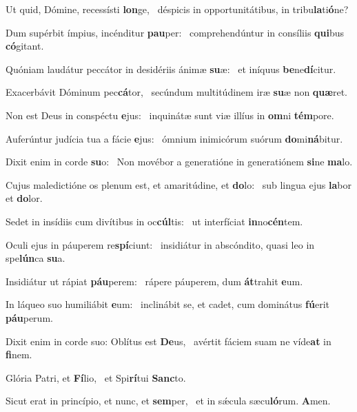 \item Ut quid, Dómine, recessísti \textbf{lon}ge,~\psstar{} déspicis in opportunitátibus, in tribu\textbf{la}ti\textbf{ó}ne?
\item Dum supérbit ímpius, incénditur \textbf{pau}per:~\psstar{} comprehendúntur in consíliis \textbf{qui}bus \textbf{có}gitant.
\item Quóniam laudátur peccátor in desidériis ánimæ \textbf{su}æ:~\psstar{} et iníquus \textbf{be}ne\textbf{dí}citur.
\item Exacerbávit Dóminum pec\textbf{cá}tor,~\psstar{} secúndum multitúdinem iræ \textbf{su}æ non \textbf{quæ}ret.
\item Non est Deus in conspéctu \textbf{e}jus:~\psstar{} inquinátæ sunt viæ illíus in \textbf{om}ni \textbf{tém}pore.
\item Auferúntur judícia tua a fácie \textbf{e}jus:~\psstar{} ómnium inimicórum suórum \textbf{do}mi\textbf{ná}bitur.
\item Dixit enim in corde \textbf{su}o:~\psstar{} Non movébor a generatióne in generatiónem \textbf{si}ne \textbf{ma}lo.
\item Cujus maledictióne os plenum est, et amaritúdine, et \textbf{do}lo:~\psstar{} sub lingua ejus \textbf{la}bor et \textbf{do}lor.
\item Sedet in insídiis cum divítibus in oc\textbf{cúl}tis:~\psstar{} ut interfíciat \textbf{in}no\textbf{cén}tem.
\item Oculi ejus in páuperem re\textbf{spí}ciunt:~\psstar{} insidiátur in abscóndito, quasi leo in spe\textbf{lún}ca \textbf{su}a.
\item Insidiátur ut rápiat \textbf{páu}perem:~\psstar{} rápere páuperem, dum \textbf{át}trahit \textbf{e}um.
\item In láqueo suo humiliábit \textbf{e}um:~\psstar{} inclinábit se, et cadet, cum dominátus \textbf{fú}erit \textbf{páu}perum.
\item Dixit enim in corde suo: Oblítus est \textbf{De}us,~\psstar{} avértit fáciem suam ne víde\textbf{at} in \textbf{fi}nem.
\item Glória Patri, et \textbf{Fí}lio,~\psstar{} et Spi\textbf{rí}tui \textbf{Sanc}to.
\item Sicut erat in princípio, et nunc, et \textbf{sem}per,~\psstar{} et in sǽcula sæcu\textbf{ló}rum. \textbf{A}men.
